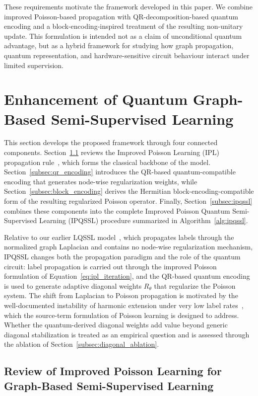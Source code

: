 \documentclass[11pt,a4paper]{article}
\begin{document}
These requirements motivate the framework developed in this paper. We combine improved Poisson-based propagation with QR-decomposition-based quantum encoding and a block-encoding-inspired treatment of the resulting non-unitary update. This formulation is intended not as a claim of unconditional quantum advantage, but as a hybrid framework for studying how graph propagation, quantum representation, and hardware-sensitive circuit behaviour interact under limited supervision.
\section{Enhancement of Quantum Graph-Based Semi-Supervised Learning}\label{sec:methods}
This section develops the proposed framework through four connected components.
Section~\ref{sec:ipl} reviews the Improved Poisson Learning (IPL) propagation
rule~\cite{bozorgnia2026improved}, which forms the classical backbone of the
model. Section~\ref{subsec:qr_encoding} introduces the QR-based
quantum-compatible encoding that generates node-wise regularization weights,
while Section~\ref{subsec:block_encoding} derives the Hermitian
block-encoding-compatible form of the resulting regularized Poisson operator.
Finally, Section~\ref{subsec:ipqssl} combines these components into the complete
Improved Poisson Quantum Semi-Supervised Learning (IPQSSL) procedure summarized
in Algorithm~\ref{alg:ipqssl}.

Relative to our earlier LQSSL model~\cite{gholipour2025laplacian}, which propagates labels through the normalized graph Laplacian and contains no node-wise regularization mechanism, IPQSSL changes both the propagation paradigm and the role of the quantum circuit: label propagation is carried out through the improved Poisson formulation of Equation~\eqref{eq:ipl_iteration}, and the QR-based quantum encoding is used to generate adaptive diagonal weights $R_\theta$ that regularize the Poisson system. The shift from Laplacian to Poisson propagation is motivated by the well-documented instability of harmonic extension under very low label rates~\cite{calder2020poisson}, which the source-term formulation of Poisson learning is designed to address. Whether the quantum-derived diagonal weights add value beyond generic diagonal stabilization is treated as an empirical question and is assessed through the ablation of Section~\ref{subsec:diagonal_ablation}.

\subsection{Review of Improved Poisson Learning for Graph-Based 
Semi-Supervised Learning}
\label{sec:ipl}
\label{subsec:poisson_system}
\end{document}
